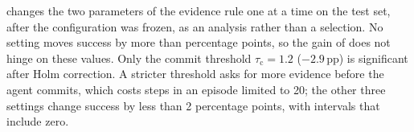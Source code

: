  changes the two parameters of the evidence rule one at a time on the test set, after the configuration was frozen, as an analysis rather than a selection. No setting moves success by more than \nSensMaxAbs{} percentage points, so the gain of \ours does not hinge on these values. Only the commit threshold $\tau_\mathrm{c}=1.2$ ($-2.9$\,pp) is significant after Holm correction. A stricter threshold asks for more evidence before the agent commits, which costs steps in an episode limited to 20; the other three settings change success by less than 2 percentage points, with intervals that include zero.
